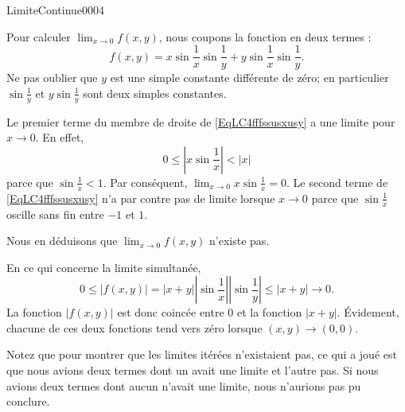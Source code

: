 \begin{corrige}{LimiteContinue0004}

	Pour calculer $\lim_{x\to 0} f(x,y)$, nous coupons la fonction en deux termes :
	\begin{equation}	\label{EqLC4fffssusxusy}
		f(x,y)=x\sin\frac{1}{ x }\sin\frac{1}{ y }+y\sin\frac{1}{ x }\sin\frac{1}{ y }.
	\end{equation}
	Ne pas oublier que $y$ est une simple constante différente de zéro; en particulier $\sin\frac{1}{ y }$ et $y\sin\frac{1}{ y }$ sont deux simples constantes.

	Le premier terme du membre de droite de \eqref{EqLC4fffssusxusy} a une limite pour $x\to 0$. En effet,
	\begin{equation}
		0\leq| x\sin\frac{1}{ x } |<| x |
	\end{equation}
	parce que $\sin\frac{1}{ x }<1$. Par conséquent, $\lim_{x\to 0} x\sin\frac{1}{ x }=0$. Le second terme de \eqref{EqLC4fffssusxusy} n'a par contre pas de limite lorsque $x\to 0$ parce que $\sin\frac{1}{ x }$ oscille sans fin entre $-1$ et $1$.

	Nous en déduisons que $\lim_{x\to 0} f(x,y)$ n'existe pas. 

	En ce qui concerne la limite simultanée,
	\begin{equation}
		0\leq| f(x,y) |=| x+y | |\sin\frac{1}{ x } | |\sin\frac{1}{ y } |\leq| x+y |\to 0.
	\end{equation}
	La fonction $| f(x,y) |$ est donc coincée entre $0$ et la fonction $| x+y |$. Évidement, chacune de ces deux fonctions tend vers zéro lorsque $(x,y)\to(0,0)$.

	Notez que pour montrer que les limites itérées n'existaient pas, ce qui a joué est que nous avions deux termes dont un avait une limite et l'autre pas. Si nous avions deux termes dont aucun n'avait une limite, nous n'aurions pas pu conclure.

\end{corrige}

